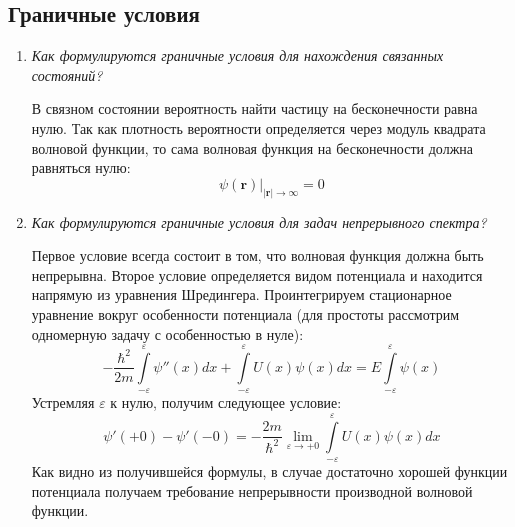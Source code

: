 \documentclass{article}
\begin{document}
\subsection*{Граничные условия}

\begin{enumerate}
	\item \textit{Как формулируются граничные условия для нахождения связанных состояний?}
	
	В связном состоянии вероятность найти частицу на бесконечности равна нулю. Так как плотность вероятности определяется через модуль квадрата волновой функции, то сама волновая функция на бесконечности должна равняться нулю:
	\begin{equation}
		\left.\psi(\textbf{r})\right|_{|\textbf{r}| \to \infty} = 0
	\end{equation}
	
	\item \textit{Как формулируются граничные условия для задач непрерывного спектра?}
	
	Первое условие всегда состоит в том, что волновая функция должна быть непрерывна. Второе условие определяется видом потенциала и находится напрямую из уравнения Шредингера. Проинтегрируем стационарное уравнение вокруг особенности потенциала (для простоты рассмотрим одномерную задачу с особенностью в нуле):
	\begin{equation}
		-\frac{\hbar^2}{2m}\int\limits_{-\varepsilon}^{\varepsilon}\psi''(x)dx + \int\limits_{-\varepsilon}^{\varepsilon} U(x)\psi(x)dx = E\int\limits_{-\varepsilon}^{\varepsilon}\psi(x)
	\end{equation}
	Устремляя $\varepsilon$ к нулю, получим следующее условие:
	\begin{equation}
		\psi'(+0) - \psi'(-0) = -\frac{2m}{\hbar^2} \lim_{\varepsilon \to +0}\int\limits_{-\varepsilon}^{\varepsilon} U(x)\psi(x)dx
	\end{equation}
	Как видно из получившейся формулы, в случае достаточно хорошей функции потенциала получаем требование непрерывности производной волновой функции.

\end{enumerate}
\end{document}
